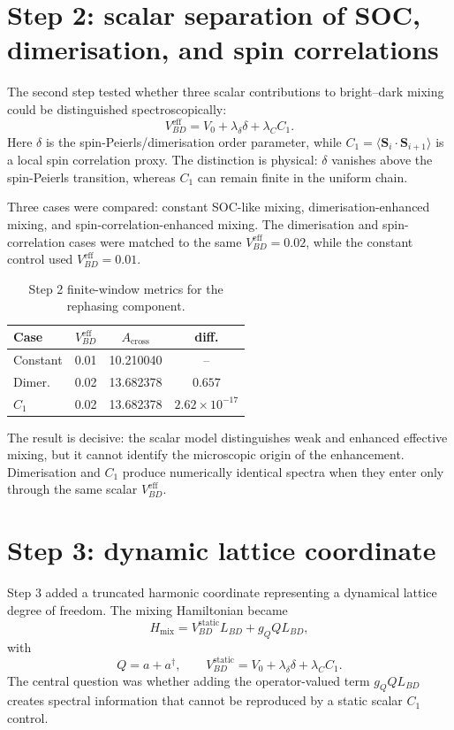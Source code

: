 \documentclass[10pt,twocolumn]{article}
\begin{document}
\section{Step 2: scalar separation of SOC, dimerisation, and spin correlations}

The second step tested whether three scalar contributions to bright--dark
mixing could be distinguished spectroscopically:
\begin{equation}
V_{BD}^{\mathrm{eff}}
= V_0+\lambda_\delta\delta+\lambda_C C_1 .
\end{equation}
Here $\delta$ is the spin-Peierls/dimerisation order parameter, while
$C_1=\langle \mathbf{S}_i\cdot\mathbf{S}_{i+1}\rangle$ is a local spin
correlation proxy.  The distinction is physical: $\delta$ vanishes above the
spin-Peierls transition, whereas $C_1$ can remain finite in the uniform chain.

Three cases were compared: constant SOC-like mixing, dimerisation-enhanced
mixing, and spin-correlation-enhanced mixing.  The dimerisation and
spin-correlation cases were matched to the same
$V_{BD}^{\mathrm{eff}}=0.02$, while the constant control used
$V_{BD}^{\mathrm{eff}}=0.01$.

\begin{table}[b]
\centering
\caption{Step 2 finite-window metrics for the rephasing component.}
\small
\begin{tabular}{lccc}
\toprule
Case & $V_{BD}^{\mathrm{eff}}$ & $A_{\mathrm{cross}}$ & diff. \\
\midrule
Constant & 0.01 & 10.210040 & -- \\
Dimer. & 0.02 & 13.682378 & $0.657$ \\
$C_1$ & 0.02 & 13.682378 & $2.62\times10^{-17}$ \\
\bottomrule
\end{tabular}
\label{tab:step2}
\end{table}

The result is decisive: the scalar model distinguishes weak and enhanced
effective mixing, but it cannot identify the microscopic origin of the
enhancement.  Dimerisation and $C_1$ produce numerically identical spectra when
they enter only through the same scalar $V_{BD}^{\mathrm{eff}}$.

\section{Step 3: dynamic lattice coordinate}

Step 3 added a truncated harmonic coordinate representing a dynamical lattice
degree of freedom.  The mixing Hamiltonian became
\begin{equation}
H_{\mathrm{mix}} =
V_{BD}^{\mathrm{static}} L_{BD}
+ g_Q Q L_{BD},
\end{equation}
with
\begin{equation}
Q=a+a^\dagger,
\qquad
V_{BD}^{\mathrm{static}}=
V_0+\lambda_\delta\delta+\lambda_C C_1 .
\end{equation}
The central question was whether adding the operator-valued term
$g_Q QL_{BD}$ creates spectral information that cannot be reproduced by a
static scalar $C_1$ control.
\end{document}

